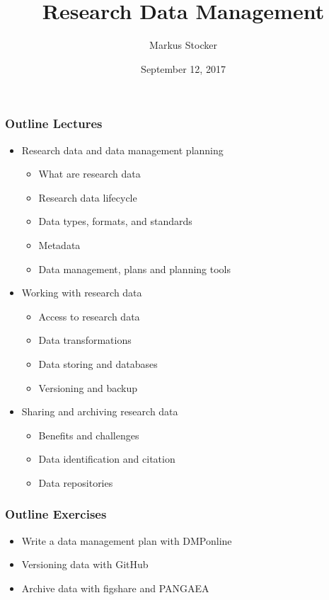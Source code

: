 \documentclass{beamer}
\title{Research Data Management}
\author{Markus Stocker}
\date{September 12, 2017}
\begin{document}
\maketitle

\begin{frame}
  \frametitle{Outline Lectures}
  
  \begin{itemize}
  \item Research data and data management planning
  \begin{itemize}
  \item What are research data
  \item Research data lifecycle
  \item Data types, formats, and standards
  \item Metadata
  \item Data management, plans and planning tools
  \end{itemize}
  \item Working with research data
  \begin{itemize}
  \item Access to research data
  \item Data transformations
  \item Data storing and databases
  \item Versioning and backup
  \end{itemize}
  \item Sharing and archiving research data
  \begin{itemize}
  \item Benefits and challenges
  \item Data identification and citation
  \item Data repositories
  \end{itemize}
  \end{itemize}
  
\end{frame}

\begin{frame}
  \frametitle{Outline Exercises}
  
  \begin{itemize}
  \item Write a data management plan with DMPonline
  \item Versioning data with GitHub
  \item Archive data with figshare and PANGAEA
  \end{itemize}
  
\end{frame}
\end{document}
